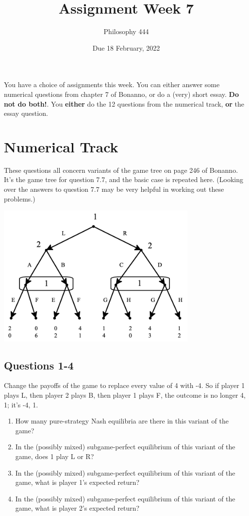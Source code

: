 \documentclass[
  11pt,
]{article}
\title{Assignment Week 7}
\author{Philosophy 444}
\date{Due 18 February, 2022}
\providecommand{\tightlist}{%
  \setlength{\itemsep}{0pt}\setlength{\parskip}{0pt}}
\begin{document}
\maketitle


You have a choice of assignments this week. You can either answer some
numerical questions from chapter 7 of Bonanno, or do a (very) short
essay. \textbf{Do not do both!}. You \textbf{either} do the 12 questions
from the numerical track, \textbf{or} the essay question.

\hypertarget{numerical-track}{%
\section{Numerical Track}\label{numerical-track}}

These questions all concern variants of the game tree on page 246 of
Bonanno. It's the game tree for question 7.7, and the basic case is
repeated here. (Looking over the answers to question 7.7 may be very
helpful in working out these problems.)

\includegraphics[width=0.75\textwidth,height=\textheight]{bonanno-tree.png}

\hypertarget{questions-1-4}{%
\subsection{Questions 1-4}\label{questions-1-4}}

Change the payoffs of the game to replace every value of 4 with -4. So
if player 1 plays L, then player 2 plays B, then player 1 plays F, the
outcome is no longer 4, 1; it's -4, 1.

\begin{enumerate}
\def\labelenumi{\arabic{enumi}.}
\tightlist
\item
  How many pure-strategy Nash equilibria are there in this variant of
  the game?
\item
  In the (possibly mixed) subgame-perfect equilibrium of this variant of
  the game, does 1 play L or R?
\item
  In the (possibly mixed) subgame-perfect equilibrium of this variant of
  the game, what is player 1's expected return?
\item
  In the (possibly mixed) subgame-perfect equilibrium of this variant of
  the game, what is player 2's expected return?
\end{enumerate}
\end{document}
